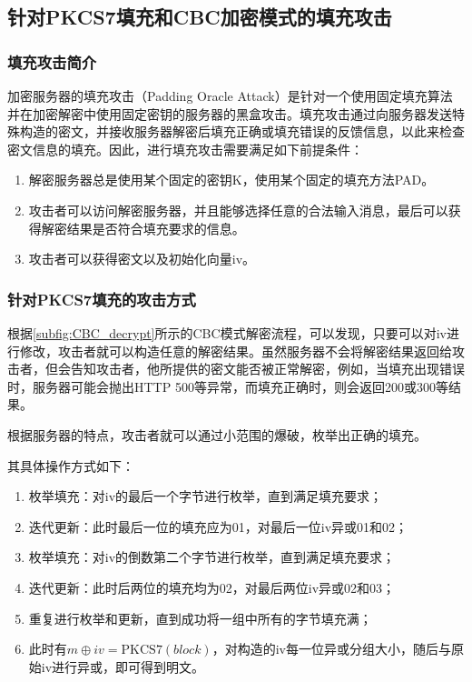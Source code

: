 \documentclass[a4paper, zihao=-4, UTF-8]{ctexart}
\newcommand{\upcite}[1]{{\textsuperscript{\cite{#1}}}}
\begin{document}
			\subsection{针对PKCS7填充和CBC加密模式的填充攻击}
				\subsubsection{填充攻击简介}
					加密服务器的填充攻击（Padding Oracle Attack）是针对一个使用固定填充算法并在加密解密中使用固定密钥的服务器的黑盒攻击。填充攻击通过向服务器发送特殊构造的密文，并接收服务器解密后填充正确或填充错误的反馈信息，以此来检查密文信息的填充。因此，进行填充攻击需要满足如下前提条件：
					\begin{enumerate}[1.]
						\item 解密服务器总是使用某个固定的密钥K，使用某个固定的填充方法PAD。
						\item 攻击者可以访问解密服务器，并且能够选择任意的合法输入消息，最后可以获得解密结果是否符合填充要求的信息。
						\item 攻击者可以获得密文以及初始化向量iv。
					\end{enumerate}
				\subsubsection{针对PKCS7填充的攻击方式}
					根据\cref{subfig:CBC_decrypt}所示的CBC模式解密流程，可以发现，只要可以对iv进行修改，攻击者就可以构造任意的解密结果。虽然服务器不会将解密结果返回给攻击者，但会告知攻击者，他所提供的密文能否被正常解密，例如，当填充出现错误时，服务器可能会抛出HTTP 500等异常，而填充正确时，则会返回200或300等结果。\upcite{1, 2}
					
					根据服务器的特点，攻击者就可以通过小范围的爆破，枚举出正确的填充。
					
					其具体操作方式如下：
					\begin{enumerate}[1.]
						\item 枚举填充：对iv的最后一个字节进行枚举，直到满足填充要求；
						\item 迭代更新：此时最后一位的填充应为01，对最后一位iv异或01和02；
						\item 枚举填充：对iv的倒数第二个字节进行枚举，直到满足填充要求；
						\item 迭代更新：此时后两位的填充均为02，对最后两位iv异或02和03；
						\item 重复进行枚举和更新，直到成功将一组中所有的字节填充满；
						\item 此时有$m\oplus iv=\mathrm{PKCS7}(block)$，对构造的iv每一位异或分组大小，随后与原始iv进行异或，即可得到明文。
					\end{enumerate}
				
\end{document}
